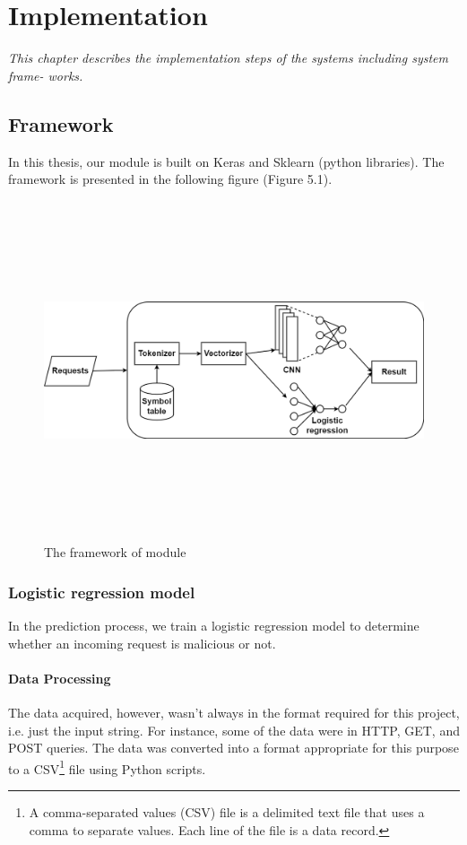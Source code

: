 \chapter{Implementation}
\label{chap:implementation}
	\textit{\hspace{0.5cm}This chapter describes the implementation steps of the systems including system frame- works.}
\minitoc
 
 
\section{Framework}
\label{sec:framework}
\hspace{0.5cm}In this thesis, our module is built on Keras and Sklearn (python libraries). The framework is presented in the following figure (Figure 5.1).

\begin{figure}[!h]
	\centering
	\includegraphics[width=\linewidth, height=10cm,keepaspectratio]{figures/Untitled Diagram.drawio (1).png}
  \caption{The framework of module}
\end{figure}   

\subsection{Logistic regression model}
\hspace{0.5cm}In the prediction process, we train a logistic regression model to determine whether an incoming request is malicious or not.
\subsubsection{Data Processing}
\hspace{0.5cm}The data acquired, however, wasn't always in the format required for this project, i.e. just the input string. For instance, some of the data were in HTTP, GET, and POST queries. The data was converted into a format appropriate for this purpose to a CSV\footnote{A comma-separated values (CSV) file is a delimited text file that uses a comma to separate values. Each line of the file is a data record.} file using Python scripts.

